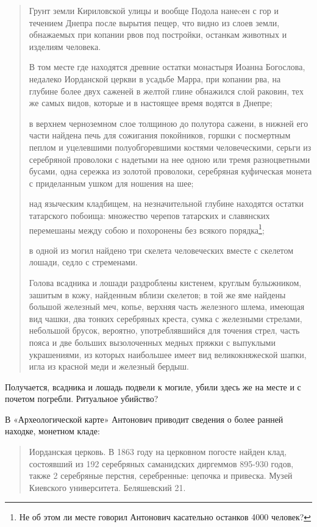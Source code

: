 \begin{quotation}
Грунт земли Кириловской улицы и вообще Подола нанеcен с гор и течением Днепра после вырытия пещер, что видно из слоев земли, обнажаемых при копании рвов под постройки, останкам животных и изделиям человека.

В том месте где находятся древние остатки монастыря Иоанна Богослова, недалеко Иорданской церкви в усадьбе Марра, при копании рва, на глубине более двух саженей в желтой глине обнажился слой раковин, тех же самых видов, которые и в настоящее время водятся в Днепре;

в верхнем черноземном слое толщиною до полутора сажени, в нижней его части найдена печь для сожигания покойников, горшки с посмертным пеплом и уцелевшими полуобгоревшими костями человеческими, серьги из серебряной проволоки с надетыми на нее одною или тремя разноцветными бусами, одна сережка из золотой проволоки, серебряная куфическая монета с приделанным ушком для ношения на шее; 

над языческим кладбищем, на незначительной глубине находятся остатки татарского побоища: множество черепов татарских и славянских перемешаны между собою и похоронены без всякого порядка\footnote{Не об этом ли месте говорил Антонович касательно останков 4000 человек?}; 

в одной из могил найдено три скелета человеческих вместе с скелетом лошади, седло с стременами.

Голова всадника и лошади раздроблены кистенем, круглым булыжником, зашитым в кожу, найденным вблизи скелетов; в той же яме найдены большой железный меч, копье, верхняя часть железного шлема, имеющая вид чашки, два тонких серебряных креста, сумка с железными стрелами, небольшой брусок, вероятно, употреблявшийся для точения стрел, часть пояса и две больших вызолоченных медных пряжки с выпуклыми украшениями, из которых наибольшее имеет вид великокняжеской шапки, игла из красной меди и железный бердыш.
\end{quotation}
 
Получается, всадника и лошадь подвели к могиле, убили здесь же на месте и с почетом погребли. Ритуальное убийство?

В «Археологической карте» Антонович приводит сведения о более ранней находке, монетном кладе:

\begin{quotation}
Иорданская церковь. В 1863 году на церковном погосте найден клад, состоявший из 192 серебряных саманидских диргеммов 895-930 годов, также 2 серебряные перстня, серебренные: цепочка и привеска. Музей Киевского университета. Беляшевский 21.
\end{quotation}

